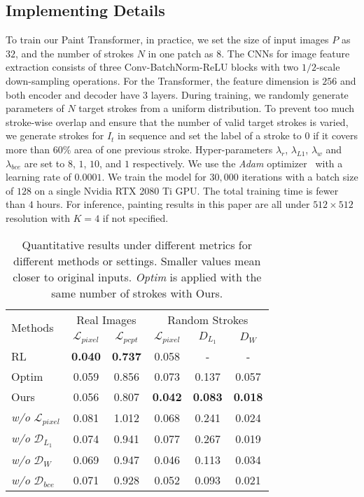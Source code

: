 \documentclass[10pt,twocolumn,letterpaper]{article}
\begin{document}
\subsection{Implementing Details}
To train our Paint Transformer, in practice, we set the size of input images $P$ as $32$, and the number of strokes $N$ in one patch as $8$.
The CNNs for image feature extraction consists of three Conv-BatchNorm-ReLU blocks with two $1/2$-scale down-sampling operations.
For the Transformer, the feature dimension is $256$ and both encoder and decoder have $3$ layers.
During training, we randomly generate parameters of $N$ target strokes from a uniform distribution.
To prevent too much stroke-wise overlap and ensure that the number of valid target strokes is varied, we generate strokes for $I_t$ in sequence and set the label of a stroke to $0$ if it covers more than 60\% area of one previous stroke.
Hyper-parameters $\lambda_r$, $\lambda_{L1}$, $\lambda_w$ and $\lambda_{bce}$ are set to $8$, $1$, $10$, and $1$ respectively.
We use the \textit{Adam} optimizer~\cite{kingma2014adam} with a learning rate of $0.0001$. 
We train the model for $30,000$ iterations with a batch size of $128$ on a single Nvidia RTX 2080 Ti GPU. The total training time is fewer than $4$ hours.
For inference, painting results in this paper are all under $512\times 512$ resolution with $K=4$ if not specified.

\begin{table}[!t]
\centering
    \begin{tabular}{lccccc}
        \toprule
        \multirow{2}{1.5cm}{Methods} & \multicolumn{2}{c}{Real Images} & \multicolumn{3}{c}{Random Strokes} \\
        \cline{2-6}
        & $\mathcal{L}_{pixel}$ & $\mathcal{L}_{pcpt}$ & $\mathcal{L}_{pixel}$ & $D_{L_1}$ & $D_W$ \\
        \midrule
        RL~\cite{huang2019learning} & \textbf{0.040} & \textbf{0.737} & 0.058 & - & - \\
        Optim~\cite{zou2020stylized} & 0.059 & 0.856 & 0.073 & 0.137 & 0.057 \\
        Ours & 0.056 & 0.807 & \textbf{0.042} & \textbf{0.083} & \textbf{0.018} \\
        \hline
        \textit{w/o} $\mathcal{L}_{pixel}$ & 0.081 & 1.012 & 0.068 & 0.241 & 0.024 \\
        \textit{w/o} $\mathcal{D}_{L_1}$ & 0.074 & 0.941 & 0.077 & 0.267 & 0.019 \\
        \textit{w/o} $\mathcal{D}_{W}$ & 0.069 & 0.947 & 0.046 & 0.113 & 0.034 \\
        \textit{w/o} $\mathcal{D}_{bce}$ & 0.071 & 0.928 & 0.052 & 0.093 & 0.021 \\
        \bottomrule
    \end{tabular}
    \vspace{0.3cm}
    \caption{Quantitative results under different metrics for different methods or settings. Smaller values mean closer to original inputs. \emph{Optim} is applied with the same number of strokes with Ours.}
    \vspace{-0.5cm}
    \label{table:quantitative}
\end{table}
\end{document}
